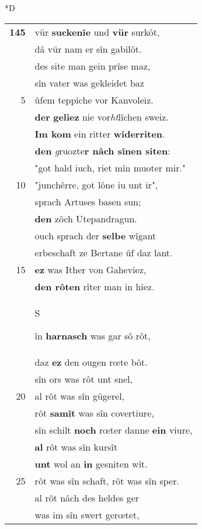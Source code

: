 \documentclass[8pt,a4paper,notitlepage]{article}
\begin{document}
\begin{table}[ht]
\begin{minipage}[t]{0.5\linewidth}
\small
\begin{center}*D
\end{center}
\begin{tabular}{rl}
\textbf{145} & vür \textbf{suckenîe} und \textbf{vür} surkôt,\\ 
 & dâ vür nam er sîn gabilôt.\\ 
 & des site man gein prîse maz,\\ 
 & sîn vater was gekleidet baz\\ 
5 & ûfem teppiche vor Kanvoleiz.\\ 
 & \textbf{der} \textbf{geliez} nie vor\textit{ht}lîchen sweiz.\\ 
 & \textbf{Im kom} ein ritter \textbf{widerriten}.\\ 
 & \textbf{den} \textit{g}ruozte\textbf{r nâch sînen siten}:\\ 
 & "got hald iuch, riet mîn muoter mir."\\ 
10 & "junchêrre, got lône iu unt ir",\\ 
 & sprach Artuses basen sun;\\ 
 & \textbf{den} zôch Utepandragun.\\ 
 & ouch sprach der \textbf{selbe} wîgant\\ 
 & erbeschaft ze Bertane ûf daz lant.\\ 
15 & \textbf{ez} was Ither von Gaheviez,\\ 
 & \textbf{den rôten} rîter man in hiez.\\ 
 & \begin{large}S\end{large}în \textbf{harnasch} was gar sô rôt,\\ 
 & daz \textbf{ez} den ougen rœte bôt.\\ 
 & sîn ors was rôt unt snel,\\ 
20 & al rôt was sîn gügerel,\\ 
 & rôt \textbf{samît} was sîn covertiure,\\ 
 & sîn schilt \textbf{noch} rœter danne \textbf{ein} viure,\\ 
 & \textbf{al} rôt was sîn kursît\\ 
 & \textbf{unt} wol an \textbf{in} gesniten wît.\\ 
25 & rôt was sîn schaft, rôt was sîn sper.\\ 
 & al rôt nâch des heldes ger\\ 
 & was im sîn swert gerœtet,\\ 

\end{tabular}
\end{minipage}
\end{table}
\end{document}
